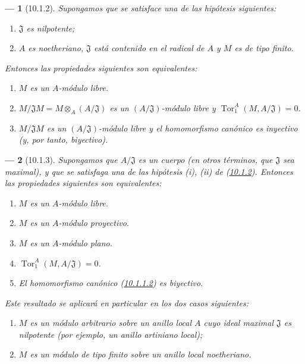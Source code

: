 \documentclass[10pt,oneside,openany]{book}
\theoremstyle{egaenv}\newtheorem*{env}{---}
\theoremstyle{egastatement}
\theoremstyle{egadescription}
\newcommand{\oldpage}[2][]{\marginnote{\normalfont\scriptsize\textbf{#1}\,|\,#2}\ignorespaces}
\begin{document}
\oldpage[0\textsubscript{III}]{18}
\begin{env}[10.1.2]
\label{0.10.1.2}
\label{0.10.1.2-fr}
Supongamos que se satisface \emph{una} de las hipótesis siguientes:
\begin{enumerate}
  \item[(i)] $\mathfrak{J}$ es nilpotente;
  \item[(ii)] $A$ es noetheriano, $\mathfrak{J}$ está contenido en el radical de $A$ y $M$ es de tipo finito.
\end{enumerate}
Entonces las propiedades siguientes son equivalentes:
\begin{enumerate}
  \item[$a)$] $M$ es un $A$-módulo libre.
  \item[$b)$] $M/\mathfrak{J}M=M\otimes_A(A/\mathfrak{J})$ es un $(A/\mathfrak{J})$-módulo libre y $\operatorname{Tor}_1^A(M,A/\mathfrak{J})=0$.
  \item[$c)$] $M/\mathfrak{J}M$ es un $(A/\mathfrak{J})$-módulo libre y el homomorfismo canónico  es inyectivo (y, por tanto, biyectivo).
\end{enumerate}
\end{env}

\begin{env}[10.1.3]
\label{0.10.1.3}
\label{0.10.1.3-fr}
Supongamos que $A/\mathfrak{J}$ es un \emph{cuerpo} (en otros términos, que $\mathfrak{J}$ sea maximal), y que se satisfaga una de las hipótesis (i), (ii) de (\hyperref[0.10.1.2-fr]{10.1.2}). Entonces las propiedades siguientes son equivalentes:
\begin{enumerate}
  \item[$a)$] $M$ es un $A$-módulo libre.
  \item[$b)$] $M$ es un $A$-módulo proyectivo.
  \item[$c)$] $M$ es un $A$-módulo plano.
  \item[$d)$] $\operatorname{Tor}_1^A(M,A/\mathfrak{J})=0$.
  \item[$e)$] El homomorfismo canónico (\hyperref[0.10.1.1.2-fr]{10.1.1.2}) es biyectivo.
\end{enumerate}
Este resultado se aplicará en particular en los dos casos siguientes:
\begin{enumerate}
  \item[(i)] $M$ es un módulo \emph{arbitrario} sobre un anillo local $A$ cuyo ideal maximal $\mathfrak{J}$ es \emph{nilpotente} (por ejemplo, un anillo artiniano local);
  \item[(ii)] $M$ es un módulo \emph{de tipo finito} sobre un anillo \emph{local noetheriano}.
\end{enumerate}
\end{env}
\end{document}
